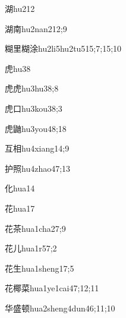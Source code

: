 \begin{verbete}{湖}{hu2}{12}
\end{verbete}
\begin{verbete}{湖南}{hu2nan2}{12;9}
\end{verbete}
\begin{verbete}{糊里糊涂}{hu2li5hu2tu5}{15;7;15;10}
\end{verbete}
\begin{verbete}{虎}{hu3}{8}
\end{verbete}
\begin{verbete}{虎虎}{hu3hu3}{8;8}
\end{verbete}
\begin{verbete}{虎口}{hu3kou3}{8;3}
\end{verbete}
\begin{verbete}{虎鼬}{hu3you4}{8;18}
\end{verbete}
\begin{verbete}{互相}{hu4xiang1}{4;9}
\end{verbete}
\begin{verbete}{护照}{hu4zhao4}{7;13}
\end{verbete}
\begin{verbete}{化}{hua1}{4}
\end{verbete}
\begin{verbete}{花}{hua1}{7}
\end{verbete}
\begin{verbete}{花茶}{hua1cha2}{7;9}
\end{verbete}
\begin{verbete}{花儿}{hua1r5}{7;2}
\end{verbete}
\begin{verbete}{花生}{hua1sheng1}{7;5}
\end{verbete}
\begin{verbete}{花椰菜}{hua1ye1cai4}{7;12;11}
\end{verbete}
\begin{verbete}{华盛顿}{hua2sheng4dun4}{6;11;10}
\end{verbete}
